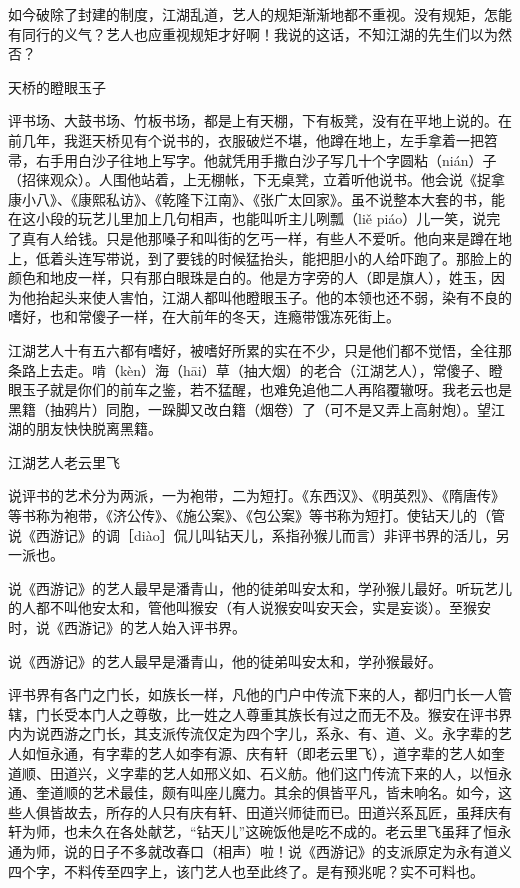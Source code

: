 \documentclass[12pt,UTF8]{ctexbook}
\begin{document}
如今破除了封建的制度，江湖乱道，艺人的规矩渐渐地都不重视。没有规矩，怎能有同行的义气？艺人也应重视规矩才好啊！我说的这话，不知江湖的先生们以为然否？





天桥的瞪眼玉子


评书场、大鼓书场、竹板书场，都是上有天棚，下有板凳，没有在平地上说的。在前几年，我逛天桥见有个说书的，衣服破烂不堪，他蹲在地上，左手拿着一把笤帚，右手用白沙子往地上写字。他就凭用手撒白沙子写几十个字圆粘（nián）子（招徕观众）。人围他站着，上无棚帐，下无桌凳，立着听他说书。他会说《捉拿康小八》、《康熙私访》、《乾隆下江南》、《张广太回家》。虽不说整本大套的书，能在这小段的玩艺儿里加上几句相声，也能叫听主儿咧瓢（liě piáo）儿一笑，说完了真有人给钱。只是他那嗓子和叫街的乞丐一样，有些人不爱听。他向来是蹲在地上，低着头连写带说，到了要钱的时候猛抬头，能把胆小的人给吓跑了。那脸上的颜色和地皮一样，只有那白眼珠是白的。他是方字旁的人（即是旗人），姓玉，因为他抬起头来使人害怕，江湖人都叫他瞪眼玉子。他的本领也还不弱，染有不良的嗜好，也和常傻子一样，在大前年的冬天，连瘾带饿冻死街上。

江湖艺人十有五六都有嗜好，被嗜好所累的实在不少，只是他们都不觉悟，全往那条路上去走。啃（kèn）海（hāi）草（抽大烟）的老合（江湖艺人），常傻子、瞪眼玉子就是你们的前车之鉴，若不猛醒，也难免追他二人再陷覆辙呀。我老云也是黑籍（抽鸦片）同胞，一跺脚又改白籍（烟卷）了（可不是又弄上高射炮）。望江湖的朋友快快脱离黑籍。





江湖艺人老云里飞


说评书的艺术分为两派，一为袍带，二为短打。《东西汉》、《明英烈》、《隋唐传》等书称为袍带，《济公传》、《施公案》、《包公案》等书称为短打。使钻天儿的（管说《西游记》的调［diào］侃儿叫钻天儿，系指孙猴儿而言）非评书界的活儿，另一派也。

说《西游记》的艺人最早是潘青山，他的徒弟叫安太和，学孙猴儿最好。听玩艺儿的人都不叫他安太和，管他叫猴安（有人说猴安叫安天会，实是妄谈）。至猴安时，说《西游记》的艺人始入评书界。

说《西游记》的艺人最早是潘青山，他的徒弟叫安太和，学孙猴最好。



评书界有各门之门长，如族长一样，凡他的门户中传流下来的人，都归门长一人管辖，门长受本门人之尊敬，比一姓之人尊重其族长有过之而无不及。猴安在评书界内为说西游之门长，其支派传流仅定为四个字儿，系永、有、道、义。永字辈的艺人如恒永通，有字辈的艺人如李有源、庆有轩（即老云里飞），道字辈的艺人如奎道顺、田道兴，义字辈的艺人如邢义如、石义舫。他们这门传流下来的人，以恒永通、奎道顺的艺术最佳，颇有叫座儿魔力。其余的俱皆平凡，皆未响名。如今，这些人俱皆故去，所存的人只有庆有轩、田道兴师徒而已。田道兴系瓦匠，虽拜庆有轩为师，也未久在各处献艺，“钻天儿”这碗饭他是吃不成的。老云里飞虽拜了恒永通为师，说的日子不多就改春口（相声）啦！说《西游记》的支派原定为永有道义四个字，不料传至四字上，该门艺人也至此终了。是有预兆呢？实不可料也。
\end{document}

